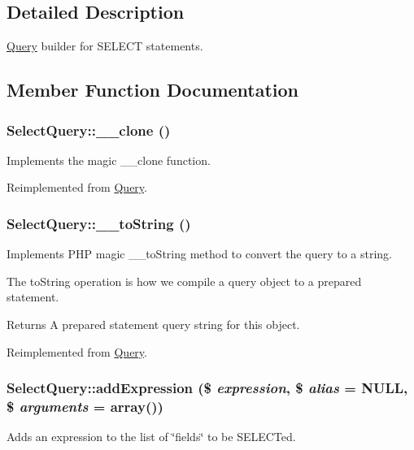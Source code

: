 \subsection{Detailed Description}
\hyperlink{classQuery}{Query} builder for SELECT statements. 

\subsection{Member Function Documentation}
\hypertarget{classSelectQuery_a4a73a8d52451d193b53192e478a88161}{
\subsubsection[{\_\-\_\-clone}]{\setlength{\rightskip}{0pt plus 5cm}SelectQuery::\_\-\_\-clone ()}}
\label{classSelectQuery_a4a73a8d52451d193b53192e478a88161}
Implements the magic \_\-\_\-clone function. 

Reimplemented from \hyperlink{classQuery_a2a0fc84cd8f0b0ffd268de81ac2472c3}{Query}.\hypertarget{classSelectQuery_ae5b1bbcecaf13957de15eb49584195b3}{
\subsubsection[{\_\-\_\-toString}]{\setlength{\rightskip}{0pt plus 5cm}SelectQuery::\_\-\_\-toString ()}}
\label{classSelectQuery_ae5b1bbcecaf13957de15eb49584195b3}
Implements PHP magic \_\-\_\-toString method to convert the query to a string.

The toString operation is how we compile a query object to a prepared statement.

\begin{DoxyReturn}{Returns}
A prepared statement query string for this object. 
\end{DoxyReturn}


Reimplemented from \hyperlink{classQuery_a16c3a3265666b784d49ce18a6fda9a8a}{Query}.\hypertarget{classSelectQuery_a8d99c03f6dea06e698640cf77c0a1d21}{
\subsubsection[{addExpression}]{\setlength{\rightskip}{0pt plus 5cm}SelectQuery::addExpression (\$ {\em expression}, \/  \$ {\em alias} = {\ttfamily NULL}, \/  \$ {\em arguments} = {\ttfamily array()})}}
\label{classSelectQuery_a8d99c03f6dea06e698640cf77c0a1d21}
Adds an expression to the list of \char`\"{}fields\char`\"{} to be SELECTed.

